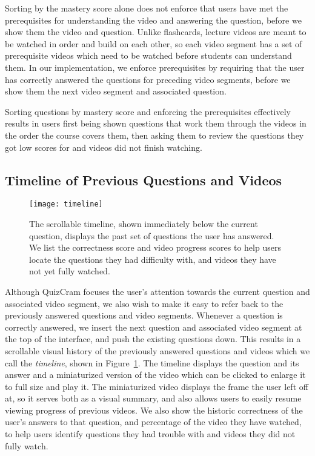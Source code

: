 \documentclass{sigchi}
\begin{document}
Sorting by the mastery score alone does not enforce that users have met the prerequisites for understanding the video and answering the question, before we show them the video and question. Unlike flashcards, lecture videos are meant to be watched in order and build on each other, so each video segment has a set of prerequisite videos which need to be watched before students can understand them. In our implementation, we enforce prerequisites by requiring that the user has correctly answered the questions for preceding video segments, before we show them the next video segment and associated question.

Sorting questions by mastery score and enforcing the prerequisites effectively results in users first being shown questions that work them through the videos in the order the course covers them, then asking them to review the questions they got low scores for and videos did not finish watching.

\subsection{Timeline of Previous Questions and Videos}

\begin{figure}
\centering
\texttt{[image: timeline]}
\caption{The scrollable timeline, shown immediately below the current question, displays the past set of questions the user has answered. We list the correctness score and video progress scores to help users locate the questions they had difficulty with, and videos they have not yet fully watched.}
\label{fig:figure3}
\end{figure}

Although QuizCram focuses the user's attention towards the current question and associated video segment, we also wish to make it easy to refer back to the previously answered questions and video segments. Whenever a question is correctly answered, we insert the next question and associated video segment at the top of the interface, and push the existing questions down. This results in a scrollable visual history of the previously answered questions and videos which we call the \emph{timeline}, shown in Figure~\ref{fig:figure3}. The timeline displays the question and its answer and a miniaturized version of the video which can be clicked to enlarge it to full size and play it. The miniaturized video displays the frame the user left off at, so it serves both as a visual summary, and also allows users to easily resume viewing progress of previous videos. We also show the historic correctness of the user's answers to that question, and percentage of the video they have watched, to help users identify questions they had trouble with and videos they did not fully watch.
\end{document}
